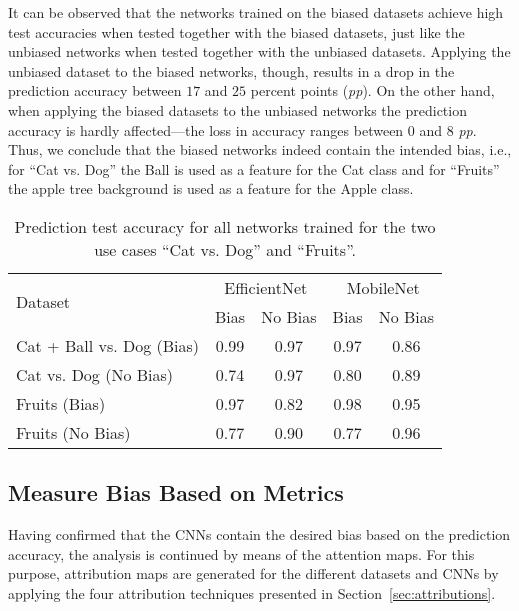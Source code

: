 \documentclass[runningheads]{llncs}
\begin{document}
It can be observed that the networks trained on the biased datasets achieve high test accuracies when tested together with the biased datasets, just like the unbiased networks when tested together with the unbiased datasets. Applying the unbiased dataset to the biased networks, though, results in a drop in the prediction accuracy between $17$ and $25$ percent points (\emph{pp}). On the other hand, when applying the biased datasets to the unbiased networks the prediction accuracy is hardly affected---the loss in accuracy ranges between $0$ and $8$ \emph{pp}. Thus, we conclude that the biased networks indeed contain the intended bias, i.e., for \enquote{Cat vs. Dog} the Ball is used as a feature for the Cat class and for \enquote{Fruits} the apple tree background is used as a feature for the Apple class.

\begin{table}[bp]
\setlength{\tabcolsep}{6pt}
\begin{center}
\vspace{-6mm}
\caption{Prediction test accuracy for all networks trained for the two use cases \enquote{Cat vs. Dog} and \enquote{Fruits}.}
\begin{tabular}{l|| c|c | c|c}
     \multirow{2}{*}{Dataset} &\multicolumn{2}{c|}{EfficientNet} & \multicolumn{2}{c}{MobileNet}\\ \cline{2-5}
                                & Bias & No Bias & Bias & No Bias  \\  \hline
      Cat + Ball vs. Dog (Bias) & 0.99 & 0.97    & 0.97 & 0.86     \\
      Cat vs. Dog (No Bias)     & 0.74 & 0.97    & 0.80 & 0.89     \\ \hline
      Fruits (Bias)             & 0.97 & 0.82    & 0.98 & 0.95     \\
      Fruits (No Bias)          & 0.77 & 0.90    & 0.77 & 0.96    
\end{tabular}
\label{tab:model-results}
\end{center}
\end{table}

\subsection{Measure Bias Based on Metrics}
Having confirmed that the CNNs contain the desired bias based on the prediction accuracy, the analysis is continued by means of the attention maps. For this purpose, attribution maps are generated for the different datasets and CNNs by applying the four attribution techniques presented in Section~\ref{sec:attributions}.
\end{document}
